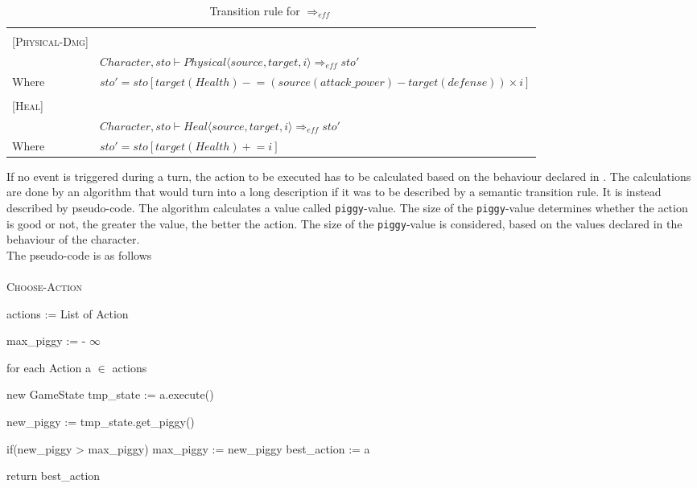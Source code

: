 \begin{table}[!h]
\begin{tabular}{l p{}}
\\ \hline \\
\small{[\textsc{Physical-Dmg}]} & \\
 & \footnotesize{$Character, sto \vdash Physical \langle  source, target, i \rangle \Rightarrow_{eff} sto'$} \\ %
 \footnotesize{Where} & \footnotesize{$sto' = sto[target(Health) -\!\!= (source(attack\_power)- target(defense)) \times i]$} \\
 \\
\small{[\textsc{Heal}]} & \\
 & \footnotesize{$Character, sto \vdash Heal \langle source, target, i \rangle \Rightarrow_{eff} sto'$} \\
  \footnotesize{Where} & \footnotesize{$sto' = sto[target(Health) +\!\!=  i]$}
 \\ \hline
\end{tabular}
\caption{Transition rule for $\Rightarrow_{eff}$}
\label{tbl:physical}
\end{table}


If no event is triggered during a turn, the action to be executed has to be calculated based on the behaviour declared in \langname{}.
The calculations are done by an algorithm that would turn into a long description if it was to be described by a semantic transition rule. It is instead described by pseudo-code.
The algorithm calculates a value called \texttt{piggy}-value. The size of the \texttt{piggy}-value determines whether the action is good or not, the greater the value, the better the action.
The size of the \texttt{piggy}-value is considered, based on the values declared in the behaviour of the character.\\
The pseudo-code is as follows \\\\
\textsc{Choose-Action}
\begin{algorithm}
actions := List of Action

max\_piggy := - $\infty$\;

for each Action a $\in$ actions{

    new GameState tmp\_state := a.execute()\;
    
    new\_piggy := tmp\_state.get\_piggy()\;
    
    if(new\_piggy > max\_piggy){
        max\_piggy := new\_piggy\;
        best\_action := a\;
        }
    }
return best\_action\;
\end{algorithm}

